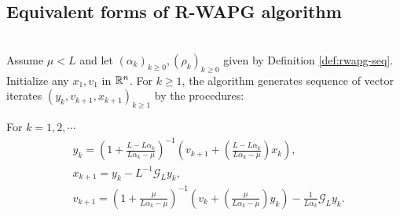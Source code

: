 \documentclass[12pt]{article}
\begin{document}
    \subsection{Equivalent forms of R-WAPG algorithm}
        \begin{definition}\label{def:r-wapg-intermediate}\;\\
            Assume $\mu < L$ and let $(\alpha_k)_{k \ge 0}, (\rho_k)_{k \ge 0}$ given by Definition \ref{def:rwapg-seq}. 
            Initialize any $x_1, v_1$ in $\mathbb R^n$. 
            For $k \ge 1$, the algorithm generates sequence of vector iterates $(y_{k}, v_{k + 1}, x_{k + 1})_{k \ge 1}$ by the procedures: 
            \begin{tcolorbox}
                For $k = 1, 2, \cdots$
                \begin{align*} 
                    & y_{k} = 
                    \left(
                        1 + \frac{L - L\alpha_{k}}{L\alpha_{k} - \mu}
                    \right)^{-1}
                    \left(
                        v_{k + 1} + 
                        \left(\frac{L - L\alpha_{k}}{L\alpha_{k} - \mu} \right) x_{k}
                    \right), 
                    \\
                    & x_{k + 1} = 
                    y_k - L^{-1} \mathcal G_L y_k, 
                    \\
                    & v_{k + 1} = 
                    \left(
                        1 + \frac{\mu}{L \alpha_k - \mu}
                    \right)^{-1}
                    \left(
                        v_k + 
                        \left(\frac{\mu}{L \alpha_k - \mu}\right) y_k
                    \right) - \frac{1}{L\alpha_{k}}\mathcal G_L y_k. 
                \end{align*}
            \end{tcolorbox}
        \end{definition}
\end{document}
